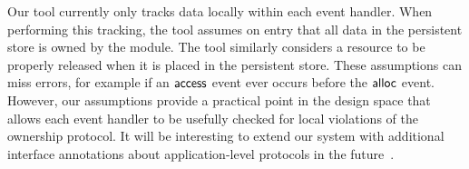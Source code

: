 Our tool currently only tracks data locally within each event handler.
When performing this tracking, the tool assumes on entry that all data
in the persistent store is owned by the module.  The tool similarly
considers a resource to be properly released when it is placed in the
persistent store.  These assumptions can miss errors, for example if
an ${\mathsf{access}}$ event ever occurs before the ${\mathsf{alloc}}$ event.  However,
our assumptions provide a practical point in the design space that
allows each event handler to be usefully checked for local violations
of the ownership protocol.
%
It will be interesting to extend our system with additional interface
annotations about application-level protocols in the
future~\cite{AlurPOPL05,HJM05}.



